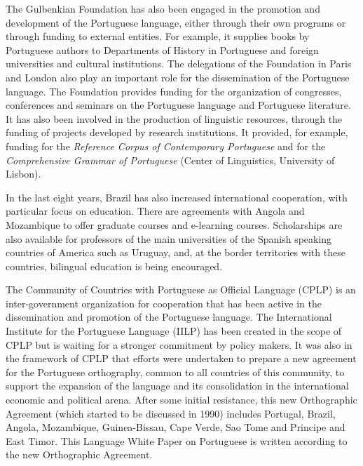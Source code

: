 \documentclass[]{../metanetpaper}
\begin{document}
\begin{multicols}{2}

The Gulbenkian Foundation\cite{gulbenkian} has also been engaged in the promotion and development of the Portuguese language, either through their own programs or through funding to external entities. For example, it supplies books by Portuguese authors to Departments of History in Portuguese and foreign universities and cultural institutions. The delegations of the Foundation in Paris and London also play an important role for the dissemination of the Portuguese language. The Foundation provides funding for the organization of congresses, conferences and seminars on the Portuguese language and Portuguese literature. It has also been involved in the production of linguistic resources, through the funding of projects developed by research institutions. It provided, for example, funding for the \textit{Reference Corpus of Contemporary Portuguese} and for the \textit{Comprehensive Grammar of Portuguese} (Center of Linguistics, University of Lisbon).

In the last eight years, Brazil has also increased international cooperation, with particular focus on education. There are agreements with Angola and Mozambique to offer graduate courses and e-learning courses. Scholarships are also available for professors of the main universities of the Spanish speaking countries of America such as Uruguay, and, at the border territories with these countries, bilingual education is being encouraged.

The Community of Countries with Portuguese as Official Language (CPLP) is an inter-government organization for cooperation that has been active in the dissemination and promotion of the Portuguese language. The International Institute for the Portuguese Language (IILP) has been created in the scope of CPLP but is waiting for a stronger commitment by policy makers. It was also in the framework of CPLP that efforts were undertaken to prepare a new agreement for the Portuguese orthography\cite{pinto}, common to all countries of this community, to support the expansion of the language and its consolidation in the international economic and political arena. After some initial resistance, this new Orthographic Agreement (which started to be discussed in 1990) includes Portugal, Brazil, Angola, Mozambique, Guinea-Bissau, Cape Verde, Sao Tome and Principe and East Timor. This Language White Paper on Portuguese is written according to the new Orthographic Agreement.


\end{multicols}
\end{document}
